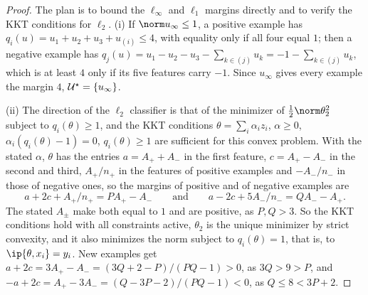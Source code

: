 \begin{refsection}

\begin{proof}
The plan is to bound the $\ell_\infty$ and $\ell_1$ margins directly and to verify the KKT conditions for $\ell_2$. (i) If $\norm u_\infty\le1$, a positive example has $q_i(u)=u_1+u_2+u_3+u_{(i)}\le4$, with equality only if all four equal $1$; then a negative example has $q_j(u)=u_1-u_2-u_3-\sum_{k\in(j)}u_k=-1-\sum_{k\in(j)}u_k$, which is at least $4$ only if its five features carry $-1$. Since $u_\infty$ gives every example the margin $4$, $\mathcal{U}^\star=\{u_\infty\}$.

(ii) The direction of the $\ell_2$ classifier is that of the minimizer of $\frac12\norm\theta_2^2$ subject to $q_i(\theta)\ge1$, and the KKT conditions $\theta=\sum_i\alpha_iz_i$, $\alpha\ge0$, $\alpha_i(q_i(\theta)-1)=0$, $q_i(\theta)\ge1$ are sufficient for this convex problem. With the stated $\alpha$, $\theta$ has the entries $a=A_++A_-$ in the first feature, $c=A_+-A_-$ in the second and third, $A_+/n_+$ in the features of positive examples and $-A_-/n_-$ in those of negative ones, so the margins of positive and of negative examples are
\[
  a+2c+A_+/n_+=PA_+-A_-\qquad\text{and}\qquad a-2c+5A_-/n_-=QA_--A_+ .
\]
The stated $A_\pm$ make both equal to $1$ and are positive, as $P,Q>3$. So the KKT conditions hold with all constraints active, $\theta_2$ is the unique minimizer by strict convexity, and it also minimizes the norm subject to $q_i(\theta)=1$, that is, to $\ip{\theta,x_i}=y_i$. New examples get $a+2c=3A_+-A_-=(3Q+2-P)/(PQ-1)>0$, as $3Q>9>P$, and $-a+2c=A_+-3A_-=(Q-3P-2)/(PQ-1)<0$, as $Q\le8<3P+2$.


\end{proof}
\end{refsection}
